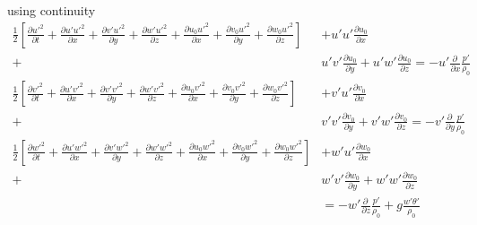 \documentclass[a4paper,10pt]{article}
\newcommand{\pd}[2]{\frac{\partial #1}{\partial #2}}
\newcommand{\fluxf}[4]{\pd{#1}{t} + \pd{#2#1}{x} + \pd{#3#1}{y} + \pd{#4#1}{z}}
\begin{document}
using continuity 
\begin{equation}
  \begin{align}
    \frac{1}{2}\left[\fluxf{u'^2}{u'}{v'}{w'} + \pd{u_0 u'^2}{x} + \pd{v_0 u'^2}{y} + \pd{w_0 u'^2}{z}\right]& + u'u'\pd{u_0}{x} \\  +& u'v'\pd{u_0}{y}  + u'w'\pd{u_0}{z} =  -u'\pd{\,}{x}\frac{p'}{\rho_0} \\
    \frac{1}{2}\left[\fluxf{v'^2}{u'}{v'}{w'} + \pd{u_0 v'^2}{x} + \pd{v_0 v'^2}{y} + \pd{w_0 v'^2}{z}\right]& + v'u'\pd{v_0}{x} \\  +& v'v'\pd{v_0}{y}  + v'w'\pd{v_0}{z} = -v'\pd{\,}{y}\frac{p'}{\rho_0} \\
    \frac{1}{2}\left[\fluxf{w'^2}{u'}{v'}{w'} + \pd{u_0 w'^2}{x} + \pd{v_0 w'^2}{y} + \pd{w_0 w'^2}{z}\right]& + w'u'\pd{w_0}{x} \\  +& w'v'\pd{w_0}{y}  + w'w'\pd{w_0}{z} & \\ & = -w'\pd{\,}{z}\frac{p'}{\rho_0} + g\frac{w'\theta'}{\rho_0}\\
  \end{align}
  \label{eqn:kinet2}
\end{equation}
\end{document}
